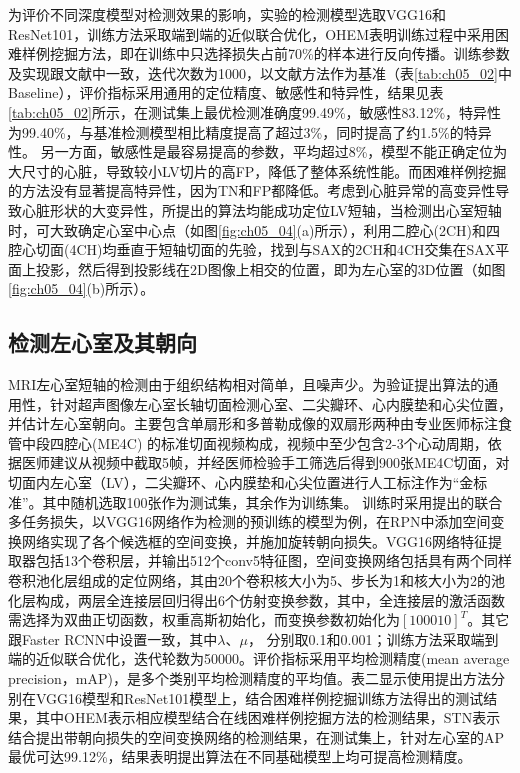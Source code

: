 为评价不同深度模型对检测效果的影响，实验的检测模型选取VGG16\citep{Simonyan2014a}和ResNet101\citep{he15}，训练方法采取端到端的近似联合优化，OHEM表明训练过程中采用困难样例挖掘方法，即在训练中只选择损失占前70\%的样本进行反向传播。训练参数及实现跟文献中一致，迭代次数为1000，以文献方法作为基准（表\ref{tab:ch05_02}中Baseline），评价指标采用通用的定位精度、敏感性和特异性，结果见表\ref{tab:ch05_02}所示，在测试集上最优检测准确度99.49\%，敏感性83.12\%，特异性为99.40\%，与基准检测模型相比精度提高了超过3\%，同时提高了约1.5\%的特异性。
另一方面，敏感性是最容易提高的参数，平均超过8\%，模型不能正确定位为大尺寸的心脏，导致较小LV切片的高FP，降低了整体系统性能。而困难样例挖掘的方法没有显著提高特异性，因为TN和FP都降低。考虑到心脏异常的高变异性导致心脏形状的大变异性，所提出的算法均能成功定位LV短轴，当检测出心室短轴时，可大致确定心室中心点（如图\ref{fig:ch05_04}(a)所示），利用二腔心(2CH)和四腔心切面(4CH)均垂直于短轴切面的先验，找到与SAX的2CH和4CH交集在SAX平面上投影，然后得到投影线在2D图像上相交的位置，即为左心室的3D位置（如图\ref{fig:ch05_04}(b)所示）。
\subsection{检测左心室及其朝向}

MRI左心室短轴的检测由于组织结构相对简单，且噪声少。为验证提出算法的通用性，针对超声图像左心室长轴切面检测心室、二尖瓣环、心内膜垫和心尖位置，并估计左心室朝向。主要包含单扇形和多普勒成像的双扇形两种由专业医师标注食管中段四腔心(ME4C) 的标准切面视频构成，视频中至少包含2-3个心动周期，依据医师建议从视频中截取5帧，并经医师检验手工筛选后得到900张ME4C切面，对切面内左心室（LV），二尖瓣环、心内膜垫和心尖位置进行人工标注作为“金标准”。其中随机选取100张作为测试集，其余作为训练集。
训练时采用提出的联合多任务损失，以VGG16网络作为检测的预训练的模型为例，在RPN中添加空间变换网络实现了各个候选框的空间变换，并施加旋转朝向损失。VGG16网络特征提取器包括13个卷积层，并输出512个conv5特征图，空间变换网络包括具有两个同样卷积池化层组成的定位网络，其由20个卷积核大小为5、步长为1和核大小为2的池化层构成，两层全连接层回归得出6个仿射变换参数，其中，全连接层的激活函数需选择为双曲正切函数，权重高斯初始化，而变换参数初始化为$[1 0 0 0 1 0]^T$。其它跟Faster RCNN中设置一致，其中$\lambda$、$\mu$， 分别取0.1和0.001；训练方法采取端到端的近似联合优化，迭代轮数为50000。评价指标采用平均检测精度(mean average precision，mAP)，是多个类别平均检测精度的平均值。表二显示使用提出方法分别在VGG16模型和ResNet101模型上，结合困难样例挖掘训练方法得出的测试结果，其中OHEM表示相应模型结合在线困难样例挖掘方法的检测结果，STN表示结合提出带朝向损失的空间变换网络的检测结果，在测试集上，针对左心室的AP最优可达99.12\%，结果表明提出算法在不同基础模型上均可提高检测精度。

